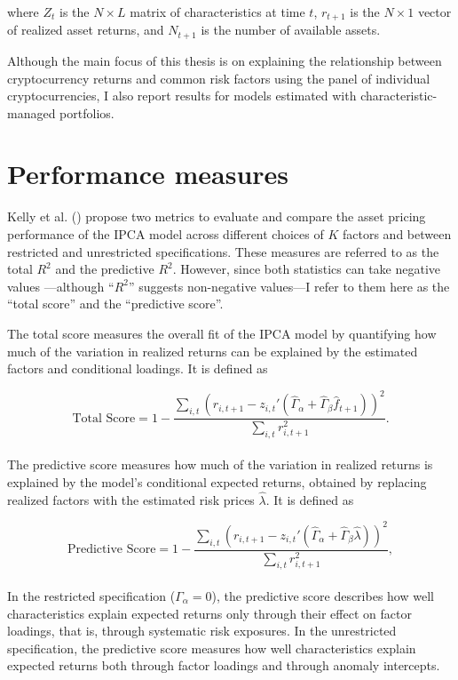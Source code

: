 \documentclass[
  12pt,
  a4paper,
  openany]{scrbook}
\begin{document}
where \(Z_t\) is the \(N \times L\) matrix of characteristics at time
\(t\), \(r_{t+1}\) is the \(N \times 1\) vector of realized asset
returns, and \(N_{t+1}\) is the number of available assets.

Although the main focus of this thesis is on explaining the relationship
between cryptocurrency returns and common risk factors using the panel
of individual cryptocurrencies, I also report results for models
estimated with characteristic-managed portfolios.

\section{Performance measures}\label{performance-measures}

Kelly et al. () propose
two metrics to evaluate and compare the asset pricing performance of the
IPCA model across different choices of \(K\) factors and between
restricted and unrestricted specifications. These measures are referred
to as the total \(R^2\) and the predictive \(R^2\). However, since both
statistics can take negative values ---although ``\(R^2\)'' suggests
non-negative values---I refer to them here as the ``total score'' and
the ``predictive score''.

The total score measures the overall fit of the IPCA model by
quantifying how much of the variation in realized returns can be
explained by the estimated factors and conditional loadings. It is
defined as

\[
\text{Total Score} = 1 - 
\frac{\sum_{i,t} \left(r_{i,t+1} - z_{i,t}'(\hat{\Gamma}_\alpha + \hat{\Gamma}_\beta \hat{f}_{t+1})\right)^2}
{\sum_{i,t} r_{i,t+1}^2}.
\]\\
The predictive score measures how much of the variation in realized
returns is explained by the model's conditional expected returns,
obtained by replacing realized factors with the estimated risk prices
\(\hat \lambda\). It is defined as

\[
\text{Predictive Score} = 1 - 
\frac{\sum_{i,t} \left(r_{i,t+1} - z_{i,t}'(\hat{\Gamma}_\alpha + \hat{\Gamma}_\beta \hat{\lambda})\right)^2}
{\sum_{i,t} r_{i,t+1}^2},
\]\\
In the restricted specification (\(\Gamma_\alpha = 0\)), the predictive
score describes how well characteristics explain expected returns only
through their effect on factor loadings, that is, through systematic
risk exposures. In the unrestricted specification, the predictive score
measures how well characteristics explain expected returns both through
factor loadings and through anomaly intercepts.
\end{document}
